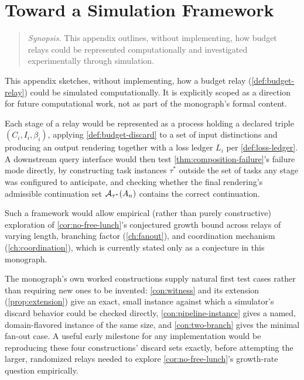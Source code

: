 \chapter{Toward a Simulation Framework}
\label{app:simulation}

\begin{quotation}
\noindent\textit{Synopsis.} This appendix outlines, without implementing,
how budget relays could be represented computationally and investigated
experimentally through simulation.
\end{quotation}


This appendix sketches, without implementing, how a budget relay
(\cref{def:budget-relay}) could be simulated computationally. It is
explicitly scoped as a direction for future computational work, not
as part of the monograph's formal content.

Each stage of a relay would be represented as a process holding a
declared triple $(C_i, I_i, \beta_i)$, applying
\cref{def:budget-discard} to a set of input distinctions and producing
an output rendering together with a loss ledger $L_i$ per
\cref{def:loss-ledger}. A downstream query interface would then test
\cref{thm:composition-failure}'s failure mode directly, by
constructing task instances $\tau^*$ outside the set of tasks any
stage was configured to anticipate, and checking whether the final
rendering's admissible continuation set $\mathcal{A}_{\tau^*}(A_n)$ contains
the correct continuation.

Such a framework would allow empirical (rather than purely
constructive) exploration of \cref{cor:no-free-lunch}'s conjectured
growth bound across relays of varying length, branching factor
(\cref{ch:fanout}), and coordination mechanism
(\cref{ch:coordination}), which is currently stated only as a
conjecture in this monograph.

The monograph's own worked constructions supply natural first test
cases rather than requiring new ones to be invented: \cref{con:witness}
and its extension (\cref{prop:extension}) give an exact, small
instance against which a simulator's discard behavior could be checked
directly, \cref{con:pipeline-instance} gives a named, domain-flavored
instance of the same size, and \cref{con:two-branch} gives the minimal
fan-out case. A useful early milestone for any implementation would be
reproducing these four constructions' discard sets exactly, before
attempting the larger, randomized relays needed to explore
\cref{cor:no-free-lunch}'s growth-rate question empirically.
